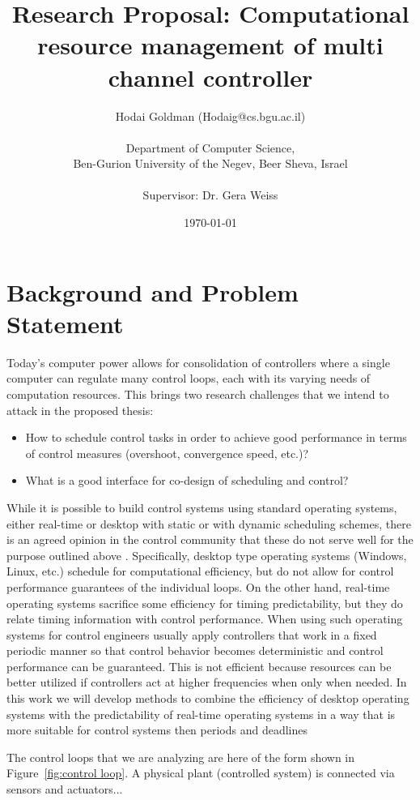 \documentclass[11pt]{article}
\author{Hodai Goldman (Hodaig@cs.bgu.ac.il) \\ \\Department of Computer Science, \\Ben-Gurion University of the Negev, Beer Sheva, Israel \\ \\Supervisor: Dr. Gera Weiss}
\date{\today}
\title{Research Proposal: Computational resource management of multi channel controller}
\begin{document}
\begin{titlepage}
\maketitle
\end{titlepage}



\section{Background and Problem Statement}
\label{sec:Background}
Today's computer power allows for consolidation of controllers where a single computer can regulate many control loops, each with its varying needs of computation resources.
This brings two research challenges that we intend to attack in the proposed thesis:
\begin{itemize}
	\item How to schedule control tasks in order to achieve good performance in terms of control measures (overshoot, convergence speed, etc.)?
	\item What is a good interface for co-design of scheduling and control?
\end{itemize}

While it is possible to build control systems using standard operating systems, either real-time or desktop with static or with dynamic scheduling schemes, there is an agreed opinion in the control community that these do not serve well for the purpose outlined above \cite{??}. Specifically, desktop type operating systems (Windows, Linux, etc.) schedule for computational efficiency, but do not allow for control performance guarantees of the individual loops. On the other hand, real-time operating systems sacrifice some efficiency for timing predictability, but they do relate timing information with control performance. When using such operating systems for control engineers usually apply controllers that work in a fixed periodic manner so that control behavior becomes deterministic and control performance can be guaranteed. This is not efficient because resources can be better utilized if controllers act at higher frequencies when only when needed. 
In this work we will develop methods to combine the efficiency of desktop operating systems with the predictability of real-time operating systems in a way that is more suitable for control systems then periods and deadlines

The control loops that we are analyzing are here of the form shown in Figure~\ref{fig:control loop}. A physical plant (controlled system) is connected via sensors and actuators... %
\end{document}
